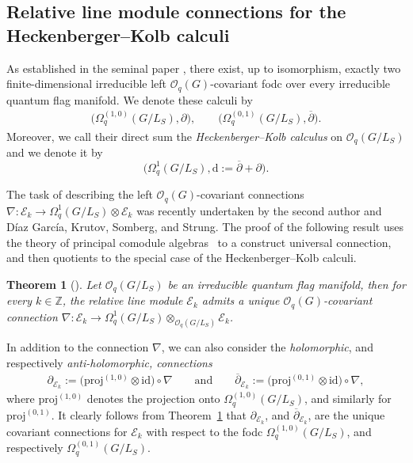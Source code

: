 \documentclass[10pt,a4paper]{amsart}
\numberwithin{equation}{section}
\newtheorem{Theorem}{Theorem}[section]
\begin{document}
\subsection{Relative line module connections for the Heckenberger--Kolb calculi}\label{section3.2}

As established in the seminal paper \cite{HKdR}, there exist, up to isomorphism, exactly two finite-dimensional irreducible left $\mathcal{O}_q(G)$-covariant fodc over every irreducible quantum flag manifold. We denote these calculi by
\begin{gather*}
\big(\Omega^{(1,0)}_q(G/L_S), \partial\big), \qquad \big(\Omega^{(0,1)}_q(G/L_S),\overline{\partial}\big).
\end{gather*}
Moreover, we call their direct sum the \emph{Heckenberger--Kolb calculus} on $\mathcal{O}_q(G/L_S)$ and we denote it by
\[
\big(\Omega^1_q(G/L_S),\mathrm{d}:=\overline{\partial}+\partial\big) .
\]

The task of describing the left $\mathcal{O}_q(G)$-covariant connections $\nabla\colon \mathcal{E}_k \to \Omega^1_q(G/L_S) \otimes \mathcal{E}_k$ was recently undertaken by the second author and D\'iaz Garc\'ia, Krutov, Somberg, and Strung. The proof of the following result uses the theory of principal comodule algebras~\cite{TBGS} to a construct universal connection, and then quotients to the special case of the Heckenberger--Kolb calculi.

\begin{Theorem}[{\cite[Theorem 4.5]{HVBQFM}}] \label{thm:CovConn}
Let $\mathcal{O}_q(G/L_S)$ be an irreducible quantum flag manifold, then for every $k \in \mathbb{Z}$, the relative line module $\mathcal{E}_k$ admits a unique $\mathcal{O}_q(G)$-covariant connection $\nabla\colon \mathcal{E}_k \to \Omega^1_q(G/L_S) \otimes_{\mathcal{O}_q(G/L_S)} \mathcal{E}_k$.
\end{Theorem}

In addition to the connection $\nabla$, we can also consider the \emph{holomorphic}, and respectively \emph{anti-holomorphic, connections}
\begin{gather*}
\partial_{\mathcal{E}_k}:= \big(\mathrm{proj}^{(1,0)}\otimes \mathrm{id} \big)\circ\nabla \qquad \mathrm{and} \qquad \overline{\partial}_{\mathcal{E}_k}:=\big(\mathrm{proj}^{(0,1)}\otimes \mathrm{id}\big)\circ\nabla,
\end{gather*}
where $\mathrm{proj}^{(1,0)}$ denotes the projection onto $\Omega^{(1,0)}_q(G/L_S)$, and similarly for $\mathrm{proj}^{(0,1)}$. It clearly follows from Theorem~\ref{thm:CovConn} that $\partial_{\mathcal{E}_k}$, and $\overline{\partial}_{\mathcal{E}_k}$, are the unique covariant connections for $\mathcal{E}_k$ with respect to the fodc $\Omega^{(1,0)}_q(G/L_S)$, and respectively $\Omega^{(0,1)}_q(G/L_S)$.
\end{document}
